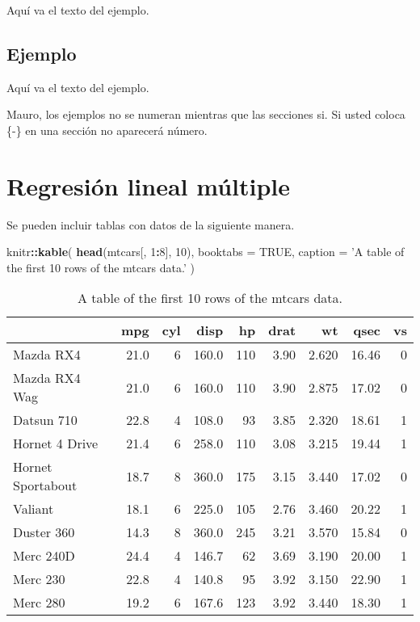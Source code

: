 \documentclass[10pt,]{krantz}
\makeatletter
\newenvironment{Shaded}{\begin{snugshade}}{\end{snugshade}}
\newcommand{\KeywordTok}[1]{\textcolor[rgb]{0.13,0.29,0.53}{\textbf{#1}}}
\newcommand{\DataTypeTok}[1]{\textcolor[rgb]{0.13,0.29,0.53}{#1}}
\newcommand{\DecValTok}[1]{\textcolor[rgb]{0.00,0.00,0.81}{#1}}
\newcommand{\StringTok}[1]{\textcolor[rgb]{0.31,0.60,0.02}{#1}}
\newcommand{\OtherTok}[1]{\textcolor[rgb]{0.56,0.35,0.01}{#1}}
\newcommand{\OperatorTok}[1]{\textcolor[rgb]{0.81,0.36,0.00}{\textbf{#1}}}
\newcommand{\NormalTok}[1]{#1}
\newenvironment{kframe}{%
\medskip{}
\setlength{\fboxsep}{.8em}
 \def\at@end@of@kframe{}%
 \ifinner\ifhmode%
  \def\at@end@of@kframe{\end{minipage}}%
  \begin{minipage}{\columnwidth}%
 \fi\fi%
 \def\FrameCommand##1{\hskip\@totalleftmargin \hskip-\fboxsep
 \colorbox{shadecolor}{##1}\hskip-\fboxsep
     \hskip-\linewidth \hskip-\@totalleftmargin \hskip\columnwidth}%
 \MakeFramed {\advance\hsize-\width
   \@totalleftmargin\z@ \linewidth\hsize
   \@setminipage}}%
 {\par\unskip\endMakeFramed%
 \at@end@of@kframe}
\renewenvironment{Shaded}{\begin{kframe}}{\end{kframe}}
\let\BeginKnitrBlock\begin \let\EndKnitrBlock\end
\makeatother
\begin{document}
Aquí va el texto del ejemplo.

\section*{Ejemplo}\label{ejemplo-1}


Aquí va el texto del ejemplo.

\BeginKnitrBlock{rmdnote}
Mauro, los ejemplos no se numeran mientras que las secciones si. Si
usted coloca \{-\} en una sección no aparecerá número.
\EndKnitrBlock{rmdnote}

\chapter{Regresión lineal múltiple}\label{rlm}

Se pueden incluir tablas con datos de la siguiente manera.

\begin{Shaded}
\begin{Highlighting}[]
\NormalTok{knitr}\OperatorTok{::}\KeywordTok{kable}\NormalTok{(}
  \KeywordTok{head}\NormalTok{(mtcars[, }\DecValTok{1}\OperatorTok{:}\DecValTok{8}\NormalTok{], }\DecValTok{10}\NormalTok{), }\DataTypeTok{booktabs =} \OtherTok{TRUE}\NormalTok{,}
  \DataTypeTok{caption =} \StringTok{'A table of the first 10 rows of the mtcars data.'}
\NormalTok{)}
\end{Highlighting}
\end{Shaded}

\begin{table}

\caption{\label{tab:unnamed-chunk-10}A table of the first 10 rows of the mtcars data.}
\centering
\begin{tabular}[t]{lrrrrrrrr}
\toprule
  & mpg & cyl & disp & hp & drat & wt & qsec & vs\\
\midrule
Mazda RX4 & 21.0 & 6 & 160.0 & 110 & 3.90 & 2.620 & 16.46 & 0\\
Mazda RX4 Wag & 21.0 & 6 & 160.0 & 110 & 3.90 & 2.875 & 17.02 & 0\\
Datsun 710 & 22.8 & 4 & 108.0 & 93 & 3.85 & 2.320 & 18.61 & 1\\
Hornet 4 Drive & 21.4 & 6 & 258.0 & 110 & 3.08 & 3.215 & 19.44 & 1\\
Hornet Sportabout & 18.7 & 8 & 360.0 & 175 & 3.15 & 3.440 & 17.02 & 0\\
\addlinespace
Valiant & 18.1 & 6 & 225.0 & 105 & 2.76 & 3.460 & 20.22 & 1\\
Duster 360 & 14.3 & 8 & 360.0 & 245 & 3.21 & 3.570 & 15.84 & 0\\
Merc 240D & 24.4 & 4 & 146.7 & 62 & 3.69 & 3.190 & 20.00 & 1\\
Merc 230 & 22.8 & 4 & 140.8 & 95 & 3.92 & 3.150 & 22.90 & 1\\
Merc 280 & 19.2 & 6 & 167.6 & 123 & 3.92 & 3.440 & 18.30 & 1\\
\bottomrule
\end{tabular}
\end{table}
\end{document}
